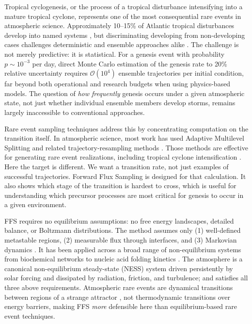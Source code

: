 \documentclass[11pt]{article}
\begin{document}
Tropical cyclogenesis, or the process of a tropical disturbance intensifying into a mature tropical cyclone, represents one of the most consequential rare events in atmospheric science. Approximately 10--15\% of Atlantic tropical disturbances develop into named systems \citep{Frank1970, gray1968global, Landsea1998}, but discriminating developing from non-developing cases challenges deterministic and ensemble approaches alike
\citep{Titley2000, Halperin2013}. The challenge is not merely predictive: it is statistical. For a genesis event with probability $p \sim 10^{-3}$ per day, direct Monte Carlo estimation of the genesis rate to 20\% relative uncertainty requires $\mathcal{O}(10^4)$ ensemble trajectories per initial condition, far beyond both operational and research budgets when using physics-based models. The question of \textit{how frequently} genesis occurs under a given atmospheric state, not just whether individual ensemble members develop storms, remains largely inaccessible to
conventional approaches.

Rare event sampling techniques address this by concentrating computation on the transition itself. In atmospheric science, most work has used Adaptive Multilevel Splitting \citep[AMS;][]{ragone2018computation, webber2019practical, galfi2019large} and related trajectory-resampling methods \citep{finkel2023revealing, finkel2024bringing}. Those methods are effective for generating rare event realizations, including tropical cyclone intensification \citep{plotkin2019maximizing}. Here the target is different. We want a transition rate, not just examples of successful trajectories. Forward Flux Sampling \citep[FFS;][]{allen2006forward, allen2009forward, valeriani2007computing, hussain2020studying} is designed for that calculation. It also shows which stage of the transition is hardest to cross, which is useful for understanding which precursor processes are most critical for genesis to occur in a given environment.

FFS requires no equilibrium assumptions: no free energy landscapes, detailed balance, or Boltzmann distributions. The method assumes only (1) well-defined metastable regions, (2) measurable flux through interfaces, and (3) Markovian dynamics \citep{allen2009forward}.
It has been applied across a broad range of non-equilibrium systems from biochemical networks \citep{allen2005sampling} to nucleic acid folding kinetics \citep{schreck2015dna}. The atmosphere is a canonical non-equilibrium steady-state (NESS) system driven persistently by solar forcing and dissipated by radiation, friction, and turbulence; and satisfies all three above requirements. Atmospheric rare events are dynamical transitions between regions of a strange attractor \citep{lorenz1969atmospheric,touchette2009large}, not thermodynamic transitions over energy barriers, making FFS \textit{more} defensible here than equilibrium-based rare event techniques.
\end{document}
